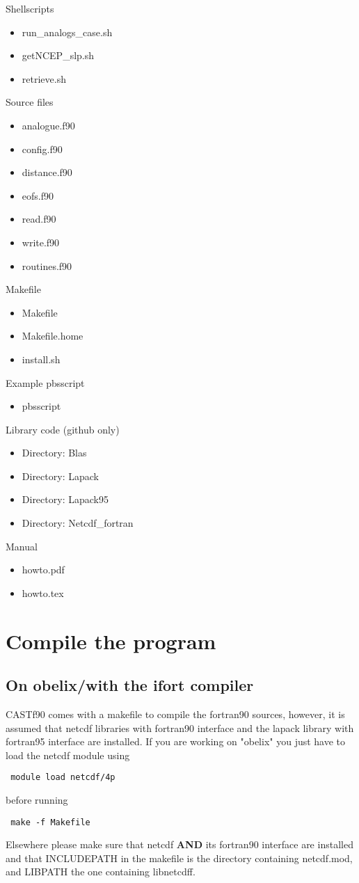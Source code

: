 \documentclass[11p,a4paper]{article}
\begin{document}
Shellscripts
\begin{itemize}
 \item run\_analogs\_case.sh
 \item getNCEP\_slp.sh 
 \item retrieve.sh
\end{itemize}
Source files
\begin{itemize}
 \item analogue.f90  
 \item config.f90  
 \item distance.f90  
 \item eofs.f90  
 \item read.f90  
 \item write.f90
 \item routines.f90 
\end{itemize}
Makefile
\begin{itemize}
 \item Makefile
 \item Makefile.home
 \item install.sh
\end{itemize}
Example pbsscript
\begin{itemize}
 \item pbsscript
\end{itemize}
Library code (github only)
\begin{itemize}
 \item Directory: Blas
 \item Directory: Lapack
 \item Directory: Lapack95
 \item Directory: Netcdf\_fortran
\end{itemize}
Manual
\begin{itemize}
 \item howto.pdf
 \item howto.tex
\end{itemize}

\section{Compile the program}
\label{sec:compil}
\subsection{On obelix/with the ifort compiler}
CASTf90 comes with a makefile to compile the fortran90 sources, however, it is assumed that netcdf libraries with fortran90 interface and the lapack library with fortran95 interface are installed.
If you are working on "obelix" you just have to load the netcdf module using
\begin{verbatim}
 module load netcdf/4p
\end{verbatim}
before running 
\begin{verbatim}
 make -f Makefile
\end{verbatim}
Elsewhere please make sure that netcdf \textbf{AND} its fortran90 interface are installed and that INCLUDEPATH in the makefile is the directory containing netcdf.mod, and LIBPATH the one containing libnetcdff. 
\end{document}
